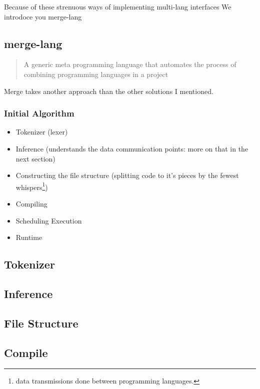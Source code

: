 \documentclass[11pt]{article}
\begin{document}
Because of these strenuous ways of implementing multi-lang interfaces We introdoce you merge-lang

\subsection{merge-lang}
\label{sec:orgb01f964}
\begin{quote}
A generic meta programming language that automates the process of combining programming languages in a project
\end{quote}

Merge takes another approach than the other solutions I mentioned.

\subsubsection{Initial Algorithm}
\label{sec:org3ca9825}
\begin{itemize}
\item Tokenizer (lexer)
\item Inference (understands the data communication points: more on that in the next section)
\item Constructing the file structure (splitting code to it's pieces by the fewest whispers\footnote{data transmissions done between programming languages.})
\item Compiling
\item Scheduling Execution
\item Runtime
\end{itemize}

\subsection{Tokenizer}
\label{sec:orgb6490d5}

\subsection{Inference}
\label{sec:org819c822}

\subsection{File Structure}
\label{sec:orgbee7e82}

\subsection{Compile}
\label{sec:orgf696a02}
\end{document}

